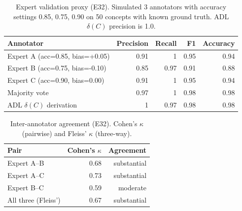 \begin{table}[htbp]
\centering
\footnotesize
\caption{Expert validation proxy (E32). Simulated 3 annotators with accuracy settings 0.85, 0.75, 0.90 on 50 concepts with known ground truth. ADL $\delta(C)$ precision is 1.0.}
\label{tab:e32-results}
\begin{tabular}{@{}lrrrr@{}}
\toprule
\textbf{Annotator} & \textbf{Precision} & \textbf{Recall} & \textbf{F1} & \textbf{Accuracy} \\
\midrule
Expert A (acc=0.85, bias=+0.05) & 0.91 & 1 & 0.95 & 0.94 \\
Expert B (acc=0.75, bias=-0.10) & 0.85 & 0.97 & 0.91 & 0.88 \\
Expert C (acc=0.90, bias=0.00) & 0.91 & 1 & 0.95 & 0.94 \\
Majority vote & 0.97 & 1 & 0.98 & 0.98 \\
ADL $\delta(C)$ derivation & 1 & 0.97 & 0.98 & 0.98 \\
\bottomrule
\end{tabular}
\end{table}

\begin{table}[htbp]
\centering
\footnotesize
\caption{Inter-annotator agreement (E32). Cohen's $\kappa$ (pairwise) and Fleiss' $\kappa$ (three-way).}
\label{tab:e32-agreement}
\begin{tabular}{@{}lrr@{}}
\toprule
\textbf{Pair} & \textbf{Cohen's $\kappa$} & \textbf{Agreement} \\
\midrule
Expert A--B & 0.68 & substantial \\
Expert A--C & 0.73 & substantial \\
Expert B--C & 0.59 & moderate \\
All three (Fleiss') & 0.67 & substantial \\
\bottomrule
\end{tabular}
\end{table}
